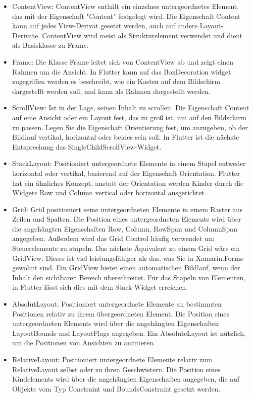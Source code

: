 \begin{itemize}
\setlength\itemsep{-0.6em}
 \item ContentView: ContentView enthält ein einzelnes untergeordnetes Element, das mit der Eigenschaft "Content" festgelegt wird. Die Eigenschaft Content kann auf jedes View-Derivat gesetzt werden, auch auf andere Layout-Derivate. ContentView wird meist als Strukturelement verwendet und dient als Basisklasse zu Frame.
 \item Frame: Die Klasse Frame leitet sich von ContentView ab und zeigt einen Rahmen um die Ansicht.  In Flutter kann auf das BoxDecoration widget zugegriffen werden es beschreibt, wie ein Kasten auf dem Bildschirm dargestellt werden soll, und kann als Rahmen dargestellt werden.
  \item ScrollView: Ist in der Lage, seinen Inhalt zu scrollen.  Die Eigenschaft Content auf eine Ansicht oder ein Layout fest, das zu groß ist, um auf den Bildschirm zu passen.  Legen Sie die Eigenschaft Orientierung fest, um anzugeben, ob der Bildlauf vertikal, horizontal oder beides sein soll. In Flutter ist die nächste Entsprechung das SingleChildScrollView-Widget. 
 \item StackLayout: Positioniert untergeordnete Elemente in einem Stapel entweder horizontal oder vertikal,  basierend auf der Eigenschaft Orientation. Flutter hat ein ähnliches Konzept, anstatt der Orientation werden Kinder durch die Widgets Row und Column vertical oder horizontal ausgerichtet. 
 \item Grid: Grid positioniert seine untergeordneten Elemente in einem Raster aus Zeilen und Spalten. Die Position eines untergeordneten Elements wird über die angehängten Eigenschaften Row, Column, RowSpan und ColumnSpan angegeben.  Außerdem wird das Grid Control häufig verwendet um Steuerelemente zu stapeln.  Das nächste Äquivalent zu einem Grid wäre ein GridView. Dieses ist viel leistungsfähiger als das, was Sie in Xamarin.Forms gewohnt sind. Ein GridView bietet einen automatischen Bildlauf, wenn der Inhalt den sichtbaren Bereich überschreitet.  Für das Stapeln von Elementen,  in Flutter lässt sich dies mit dem Stack-Widget erreichen.
 \item AbsolutLayout: Positioniert untergeordnete Elemente an bestimmten Positionen relativ zu ihrem übergeordneten Element. Die Position eines untergeordneten Elements wird über die angehängten Eigenschaften LayoutBounds und LayoutFlags angegeben. Ein AbsoluteLayout ist nützlich, um die Positionen von Ansichten zu animieren.
 \item RelativeLayout:  Positioniert untergeordnete Elemente relativ zum RelativeLayout selbst oder zu ihren Geschwistern. Die Position eines Kindelements wird über die angehängten Eigenschaften angegeben, die auf Objekte vom Typ Constraint und BoundsConstraint gesetzt werden.
\end{itemize}

